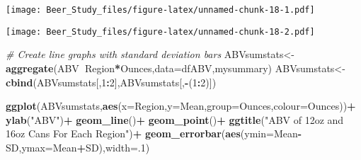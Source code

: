 \documentclass[
]{article}
\newenvironment{Shaded}{\begin{snugshade}}{\end{snugshade}}
\newcommand{\CommentTok}[1]{\textcolor[rgb]{0.56,0.35,0.01}{\textit{#1}}}
\newcommand{\DataTypeTok}[1]{\textcolor[rgb]{0.13,0.29,0.53}{#1}}
\newcommand{\DecValTok}[1]{\textcolor[rgb]{0.00,0.00,0.81}{#1}}
\newcommand{\KeywordTok}[1]{\textcolor[rgb]{0.13,0.29,0.53}{\textbf{#1}}}
\newcommand{\NormalTok}[1]{#1}
\newcommand{\OperatorTok}[1]{\textcolor[rgb]{0.81,0.36,0.00}{\textbf{#1}}}
\newcommand{\StringTok}[1]{\textcolor[rgb]{0.31,0.60,0.02}{#1}}
\begin{document}
\texttt{[image: Beer\_Study\_files/figure-latex/unnamed-chunk-18-1.pdf]}

\begin{Shaded}
\end{Shaded}

\texttt{[image: Beer\_Study\_files/figure-latex/unnamed-chunk-18-2.pdf]}

\begin{Shaded}
\begin{Highlighting}[]
\CommentTok{# Create line graphs with standard deviation bars}
\NormalTok{ABVsumstats<-}\KeywordTok{aggregate}\NormalTok{(ABV}\OperatorTok{~}\NormalTok{Region}\OperatorTok{*}\NormalTok{Ounces,}\DataTypeTok{data=}\NormalTok{dfABV,mysummary)}
\NormalTok{ABVsumstats<-}\KeywordTok{cbind}\NormalTok{(ABVsumstats[,}\DecValTok{1}\OperatorTok{:}\DecValTok{2}\NormalTok{],ABVsumstats[,}\OperatorTok{-}\NormalTok{(}\DecValTok{1}\OperatorTok{:}\DecValTok{2}\NormalTok{)])}

\KeywordTok{ggplot}\NormalTok{(ABVsumstats,}\KeywordTok{aes}\NormalTok{(}\DataTypeTok{x=}\NormalTok{Region,}\DataTypeTok{y=}\NormalTok{Mean,}\DataTypeTok{group=}\NormalTok{Ounces,}\DataTypeTok{colour=}\NormalTok{Ounces))}\OperatorTok{+}
\StringTok{  }\KeywordTok{ylab}\NormalTok{(}\StringTok{"ABV"}\NormalTok{)}\OperatorTok{+}
\StringTok{  }\KeywordTok{geom_line}\NormalTok{()}\OperatorTok{+}
\StringTok{  }\KeywordTok{geom_point}\NormalTok{()}\OperatorTok{+}
\StringTok{  }\KeywordTok{ggtitle}\NormalTok{(}\StringTok{"ABV of 12oz and 16oz Cans For Each Region"}\NormalTok{)}\OperatorTok{+}
\StringTok{  }\KeywordTok{geom_errorbar}\NormalTok{(}\KeywordTok{aes}\NormalTok{(}\DataTypeTok{ymin=}\NormalTok{Mean}\OperatorTok{-}\NormalTok{SD,}\DataTypeTok{ymax=}\NormalTok{Mean}\OperatorTok{+}\NormalTok{SD),}\DataTypeTok{width=}\NormalTok{.}\DecValTok{1}\NormalTok{)}
\end{Highlighting}
\end{Shaded}
\end{document}
